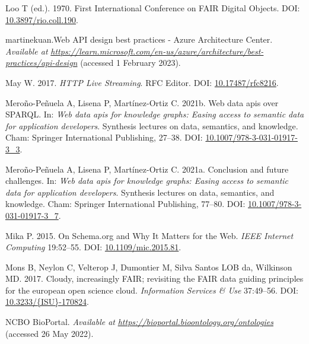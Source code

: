 \begin{CSLReferences}{1}{0}
\leavevmode{}%
Loo T (ed.). 1970. First International Conference on FAIR Digital Objects. DOI: \href{https://doi.org/10.3897/rio.coll.190}{10.3897/rio.coll.190}.

\leavevmode{}%
martinekuan.Web API design best practices - Azure Architecture Center. \emph{Available at} \href{https://learn.microsoft.com/en-us/azure/architecture/best-practices/api-design}{\emph{https://learn.microsoft.com/en-us/azure/architecture/best-practices/api-design}} (accessed 1 February 2023).

\leavevmode{}%
May W. 2017. \emph{HTTP Live Streaming}. RFC Editor. DOI: \href{https://doi.org/10.17487/rfc8216}{10.17487/rfc8216}.

\leavevmode{}%
Meroño-Peñuela A, Lisena P, Martínez-Ortiz C. 2021b. Web data apis over SPARQL. In: \emph{Web data apis for knowledge graphs: Easing access to semantic data for application developers}. Synthesis lectures on data, semantics, and knowledge. Cham: Springer International Publishing, 27--38. DOI: \href{https://doi.org/10.1007/978-3-031-01917-3_3}{10.1007/978-3-031-01917-3\_3}.

\leavevmode{}%
Meroño-Peñuela A, Lisena P, Martínez-Ortiz C. 2021a. Conclusion and future challenges. In: \emph{Web data apis for knowledge graphs: Easing access to semantic data for application developers}. Synthesis lectures on data, semantics, and knowledge. Cham: Springer International Publishing, 77--80. DOI: \href{https://doi.org/10.1007/978-3-031-01917-3_7}{10.1007/978-3-031-01917-3\_7}.

\leavevmode{}%
Mika P. 2015. On Schema.org and Why It Matters for the Web. \emph{IEEE Internet Computing} 19:52--55. DOI: \href{https://doi.org/10.1109/mic.2015.81}{10.1109/mic.2015.81}.

\leavevmode{}%
Mons B, Neylon C, Velterop J, Dumontier M, Silva Santos LOB da, Wilkinson MD. 2017. Cloudy, increasingly FAIR; revisiting the FAIR data guiding principles for the european open science cloud. \emph{Information Services \& Use} 37:49--56. DOI: \href{https://doi.org/10.3233/\%7BISU\%7D-170824}{10.3233/\{ISU\}-170824}.

\leavevmode{}%
NCBO BioPortal. \emph{Available at} \href{https://bioportal.bioontology.org/ontologies}{\emph{https://bioportal.bioontology.org/ontologies}} (accessed 26 May 2022).


\end{CSLReferences}
